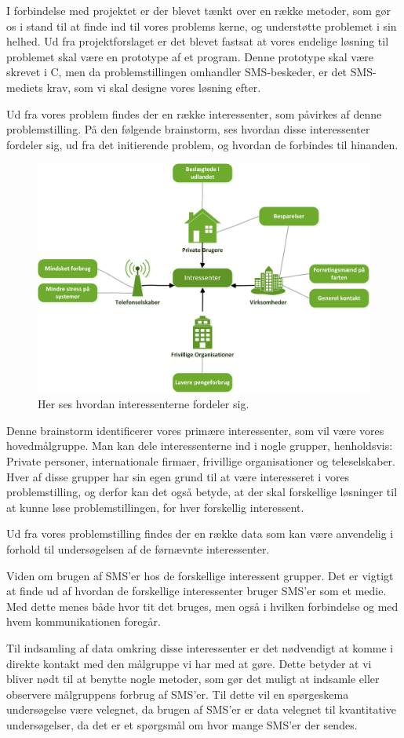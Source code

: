I forbindelse med projektet er der blevet tænkt over en række metoder, som gør os i stand til at finde ind til vores problems kerne, og understøtte problemet i sin helhed.
Ud fra projektforslaget er det blevet fastsat at vores endelige løsning til problemet skal være en prototype af et program. Denne prototype skal være skrevet i C, men da problemstillingen omhandler SMS-beskeder, er det  SMS-mediets krav, som vi skal designe vores løsning efter.


Ud fra vores problem findes der en række interessenter, som påvirkes af denne problemstilling.
På den følgende brainstorm, ses hvordan disse interessenter fordeler sig, ud fra det initierende problem, og hvordan de forbindes til hinanden.

\begin{figure}[H]
\includegraphics[width=\linewidth]{Billeder/Brainstormting.png}
\caption{Her ses hvordan interessenterne fordeler sig.}
\end{figure}

Denne brainstorm identificerer vores primære interessenter, som vil være vores hovedmålgruppe.
Man kan dele interessenterne ind i nogle grupper, henholdsvis: Private personer, internationale firmaer, frivillige organisationer og teleselskaber.
Hver af disse grupper har sin egen grund til at være interesseret i vores problemstilling, og derfor kan det også betyde, at der skal forskellige løsninger til at kunne løse problemstillingen, for hver forskellig interessent.


Ud fra vores problemstilling findes der en række data som kan være anvendelig i forhold til undersøgelsen af de førnævnte interessenter.


Viden om brugen af SMS'er hos de forskellige interessent grupper.
Det er vigtigt at finde ud af hvordan de forskellige interessenter bruger SMS'er som et medie. Med dette menes både hvor tit det bruges, men også i hvilken forbindelse og med hvem kommunikationen foregår.


Til indsamling af data omkring disse interessenter er det nødvendigt at komme i direkte kontakt med den målgruppe vi har med at gøre. Dette betyder at vi bliver nødt til at benytte nogle metoder, som gør det muligt at indsamle eller observere målgruppens forbrug af SMS'er.
Til dette vil en spørgeskema undersøgelse være velegnet, da brugen af SMS'er er data velegnet til kvantitative undersøgelser, da det er et spørgsmål om hvor mange SMS'er der sendes.
